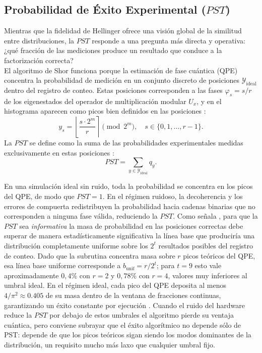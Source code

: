 \documentclass[12pt, spanish]{book}
\begin{document}
\subsection{Probabilidad de Éxito Experimental ($PST$)}

Mientras que la fidelidad de Hellinger ofrece una visión global de la similitud entre distribuciones, la $PST$ responde a una pregunta más directa y operativa: ¿qué fracción de las mediciones produce un resultado que conduce a la factorización correcta?\\

El algoritmo de Shor funciona porque la estimación de fase cuántica (QPE) concentra la probabilidad de medición en un conjunto discreto de posiciones $\mathcal{Y}_{\text{ideal}}$ dentro del registro de conteo. Estas posiciones corresponden a las fases $\varphi_s = s/r$ de los eigenestados del operador de multiplicación modular $U_x$, y en el histograma aparecen como picos bien definidos en las posiciones \cite{Nielsen2024}:
\begin{equation}
    y_s = \left\lfloor \frac{s \cdot 2^m}{r} \right\rceil \pmod{2^m}, \quad s \in \{0, 1, \dots, r-1\}.
    \label{eq:picos_qpe}
\end{equation}
La $PST$ se define como la suma de las probabilidades experimentales medidas exclusivamente en estas posiciones \cite{villarreal}:
\begin{equation}
    PST = \sum_{y \in \mathcal{Y}_{\text{ideal}}} q_y.
    \label{eq:pst_definicion}
\end{equation}

En una simulación ideal sin ruido, toda la probabilidad se concentra en los picos del QPE, de modo que $PST = 1$. En el régimen ruidoso, la decoherencia y los errores de compuerta redistribuyen la probabilidad hacia cadenas binarias que no corresponden a ninguna fase válida, reduciendo la $PST$. Como señala \cite{Bagourd2026}, para que la $PST$ sea \emph{informativa} la masa de probabilidad en las posiciones correctas debe superar de manera estadísticamente significativa la línea base que produciría una distribución completamente uniforme sobre los $2^t$ resultados posibles del registro de conteo. Dado que la subrutina concentra masa sobre $r$ picos teóricos del QPE, esa línea base uniforme corresponde a $b_{\text{unif}} = r/2^t$; para $t = 9$ esto vale aproximadamente $0{,}4\%$ con $r = 2$ y $0{,}78\%$ con $r = 4$, valores muy inferiores al umbral ideal. En el régimen ideal, cada pico del QPE deposita al menos $4/\pi^2 \approx 0.405$ \cite{ibm_phase_estimation_procedure} de su masa dentro de la ventana de fracciones continuas, garantizando un éxito constante por ejecución \cite{Bagourd2026}. Cuando el ruido del hardware reduce la $PST$ por debajo de estos umbrales el algoritmo pierde su ventaja cuántica, pero conviene subrayar que el éxito algorítmico no depende sólo de PST: depende de que los picos teóricos sigan siendo los modos dominantes de la distribución, un requisito mucho más laxo que cualquier umbral fijo. \\
\end{document}
